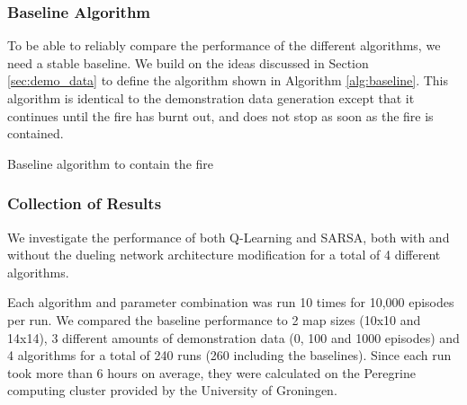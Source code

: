 \subsubsection{Baseline Algorithm}\label{sec:baseline}
To be able to reliably compare the performance of the different algorithms, we need a stable baseline. We build on the ideas discussed in Section \ref{sec:demo_data} to define the algorithm shown in Algorithm \ref{alg:baseline}. This algorithm is identical to the demonstration data generation except that it continues until the fire has burnt out, and does not stop as soon as the fire is contained.

\begin{algorithm}
  \caption{Baseline algorithm to contain the fire}
  \label{alg:baseline}
  \begin{algorithmic}[1]
    \EndIf
    \EndWhile
    \State {}
    \EndProcedure
  \end{algorithmic}
\end{algorithm}

\subsubsection{Collection of Results}\label{sec:datacollection}
We investigate the performance of both Q-Learning and SARSA, both with and without the dueling network architecture modification for a total of 4 different algorithms.

Each algorithm and parameter combination was run 10 times for 10,000 episodes per run. We compared the baseline performance to 2 map sizes (10x10 and 14x14), 3 different amounts of demonstration data (0, 100 and 1000 episodes) and 4 algorithms for a total of 240 runs (260 including the baselines). Since each run took more than 6 hours on average, they were calculated on the Peregrine computing cluster provided by the University of Groningen.
